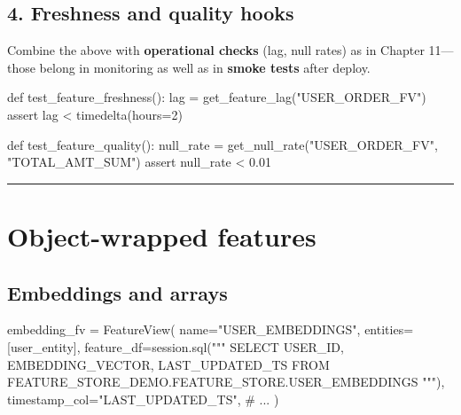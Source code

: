 \documentclass[
  letterpaper,
  DIV=11,
  numbers=noendperiod]{scrreprt}
\newenvironment{Shaded}{\begin{snugshade}}{\end{snugshade}}
\newcommand{\CommentTok}[1]{\textcolor[rgb]{0.37,0.37,0.37}{#1}}
\newcommand{\ControlFlowTok}[1]{\textcolor[rgb]{0.00,0.23,0.31}{#1}}
\newcommand{\DecValTok}[1]{\textcolor[rgb]{0.68,0.00,0.00}{#1}}
\newcommand{\FloatTok}[1]{\textcolor[rgb]{0.68,0.00,0.00}{#1}}
\newcommand{\KeywordTok}[1]{\textcolor[rgb]{0.00,0.23,0.31}{#1}}
\newcommand{\NormalTok}[1]{\textcolor[rgb]{0.00,0.23,0.31}{#1}}
\newcommand{\OperatorTok}[1]{\textcolor[rgb]{0.37,0.37,0.37}{#1}}
\newcommand{\StringTok}[1]{\textcolor[rgb]{0.13,0.47,0.30}{#1}}
\begin{document}
\hypertarget{freshness-and-quality-hooks}{%
\subsection{4. Freshness and quality
hooks}\label{freshness-and-quality-hooks}}

Combine the above with \textbf{operational checks} (lag, null rates) as
in Chapter 11---those belong in monitoring as well as in \textbf{smoke
tests} after deploy.

\begin{Shaded}
\begin{Highlighting}[]
\KeywordTok{def}\NormalTok{ test\_feature\_freshness():}
\NormalTok{    lag }\OperatorTok{=}\NormalTok{ get\_feature\_lag(}\StringTok{"USER\_ORDER\_FV"}\NormalTok{)}
    \ControlFlowTok{assert}\NormalTok{ lag }\OperatorTok{\textless{}}\NormalTok{ timedelta(hours}\OperatorTok{=}\DecValTok{2}\NormalTok{)}

\KeywordTok{def}\NormalTok{ test\_feature\_quality():}
\NormalTok{    null\_rate }\OperatorTok{=}\NormalTok{ get\_null\_rate(}\StringTok{"USER\_ORDER\_FV"}\NormalTok{, }\StringTok{"TOTAL\_AMT\_SUM"}\NormalTok{)}
    \ControlFlowTok{assert}\NormalTok{ null\_rate }\OperatorTok{\textless{}} \FloatTok{0.01}
\end{Highlighting}
\end{Shaded}

\begin{center}\rule{0.5\linewidth}{0.5pt}\end{center}

\hypertarget{object-wrapped-features}{%
\section{Object-wrapped features}\label{object-wrapped-features}}

\hypertarget{embeddings-and-arrays}{%
\subsection{Embeddings and arrays}\label{embeddings-and-arrays}}

\begin{Shaded}
\begin{Highlighting}[]
\NormalTok{embedding\_fv }\OperatorTok{=}\NormalTok{ FeatureView(}
\NormalTok{    name}\OperatorTok{=}\StringTok{"USER\_EMBEDDINGS"}\NormalTok{,}
\NormalTok{    entities}\OperatorTok{=}\NormalTok{[user\_entity],}
\NormalTok{    feature\_df}\OperatorTok{=}\NormalTok{session.sql(}\StringTok{"""}
\StringTok{        SELECT}
\StringTok{            USER\_ID,}
\StringTok{            EMBEDDING\_VECTOR,}
\StringTok{            LAST\_UPDATED\_TS}
\StringTok{        FROM FEATURE\_STORE\_DEMO.FEATURE\_STORE.USER\_EMBEDDINGS}
\StringTok{    """}\NormalTok{),}
\NormalTok{    timestamp\_col}\OperatorTok{=}\StringTok{"LAST\_UPDATED\_TS"}\NormalTok{,}
    \CommentTok{\# ...}
\NormalTok{)}
\end{Highlighting}
\end{Shaded}
\end{document}
